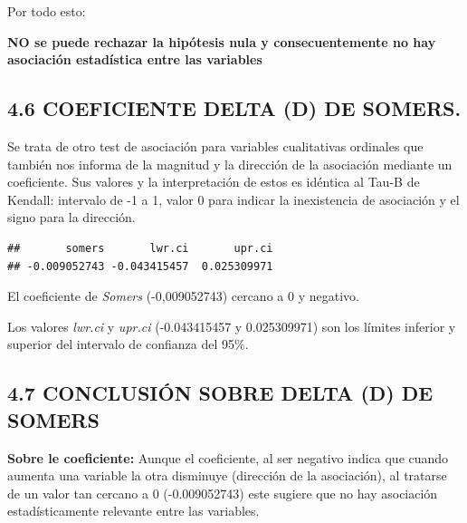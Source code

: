 \documentclass[
  12 pt,
  a4paper,
]{article}
\newenvironment{Shaded}{\begin{snugshade}}{\end{snugshade}}
\newcommand{\AttributeTok}[1]{\textcolor[rgb]{0.13,0.29,0.53}{#1}}
\newcommand{\FloatTok}[1]{\textcolor[rgb]{0.00,0.00,0.81}{#1}}
\newcommand{\FunctionTok}[1]{\textcolor[rgb]{0.13,0.29,0.53}{\textbf{#1}}}
\newcommand{\NormalTok}[1]{#1}
\newcommand{\OtherTok}[1]{\textcolor[rgb]{0.56,0.35,0.01}{#1}}
\newcommand{\SpecialCharTok}[1]{\textcolor[rgb]{0.81,0.36,0.00}{\textbf{#1}}}
\begin{document}
Por todo esto:

\textbf{NO se puede rechazar la hipótesis nula y consecuentemente no hay
asociación estadística entre las variables}

\subsection{4.6 COEFICIENTE DELTA (D) DE
SOMERS.}\label{coeficiente-delta-d-de-somers.}

Se trata de otro test de asociación para variables cualitativas
ordinales que también nos informa de la magnitud y la dirección de la
asociación mediante un coeficiente. Sus valores y la interpretación de
estos es idéntica al Tau-B de Kendall: intervalo de -1 a 1, valor 0 para
indicar la inexistencia de asociación y el signo para la dirección.

\begin{Shaded}
\end{Shaded}

\begin{verbatim}
##       somers       lwr.ci       upr.ci 
## -0.009052743 -0.043415457  0.025309971
\end{verbatim}

El coeficiente de \emph{Somers} (-0,009052743) cercano a 0 y negativo.

Los valores \emph{lwr.ci} y \emph{upr.ci} (-0.043415457 y 0.025309971)
son los límites inferior y superior del intervalo de confianza del 95\%.

\subsection{4.7 CONCLUSIÓN SOBRE DELTA (D) DE
SOMERS}\label{conclusiuxf3n-sobre-delta-d-de-somers}

\textbf{Sobre le coeficiente:} Aunque el coeficiente, al ser negativo
indica que cuando aumenta una variable la otra disminuye (dirección de
la asociación), al tratarse de un valor tan cercano a 0 (-0.009052743)
este sugiere que no hay asociación estadísticamente relevante entre las
variables.
\end{document}
